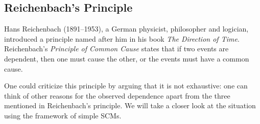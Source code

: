 \subsection{Reichenbach's Principle}

Hans Reichenbach (1891--1953), a German physicist, philosopher and logician, introduced a principle named after him in his book \emph{The Direction of Time}.
Reichenbach's \emph{Principle of Common Cause} states that if two events are dependent,
then one must cause the other, or the events must have a common cause.

One could criticize this principle by arguing that it is not exhaustive: one can think of other reasons for the observed dependence
apart from the three mentioned in Reichenbach's principle.
We will take a closer look at the situation using the framework of simple SCMs. 

